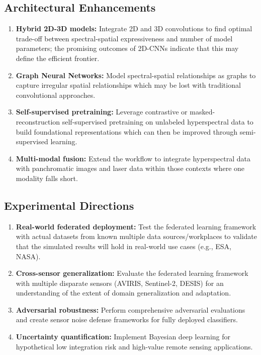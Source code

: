 \subsection{Architectural Enhancements}
\begin{enumerate}
    \item \textbf{Hybrid 2D-3D models:} Integrate 2D and 3D convolutions to find optimal trade-off between spectral-spatial expressiveness and number of model parameters; the promising outcomes of 2D-CNNs indicate that this may define the efficient frontier.

    \item \textbf{Graph Neural Networks:} Model spectral-spatial relationships as graphs to capture irregular spatial relationships which may be lost with traditional convolutional approaches.

    \item \textbf{Self-supervised pretraining:} Leverage contrastive or masked-reconstruction self-supervised pretraining on unlabeled hyperspectral data to build foundational representations which can then be improved through semi-supervised learning.

    \item \textbf{Multi-modal fusion:} Extend the workflow to integrate hyperspectral data with panchromatic images and laser data within those contexts where one modality falls short.
\end{enumerate}

\subsection{Experimental Directions}
\begin{enumerate}
    \item \textbf{Real-world federated deployment:} Test the federated learning framework with actual datasets from known multiple data sources/workplaces to validate that the simulated results will hold in real-world use cases (e.g., ESA, NASA).

    \item \textbf{Cross-sensor generalization:} Evaluate the federated learning framework with multiple disparate sensors (AVIRIS, Sentinel-2, DESIS) for an understanding of the extent of domain generalization and adaptation.

    \item \textbf{Adversarial robustness:} Perform comprehensive adversarial evaluations and create sensor noise defense frameworks for fully deployed classifiers.

    \item \textbf{Uncertainty quantification:} Implement Bayesian deep learning for hypothetical low integration risk and high-value remote sensing applications.
\end{enumerate}

